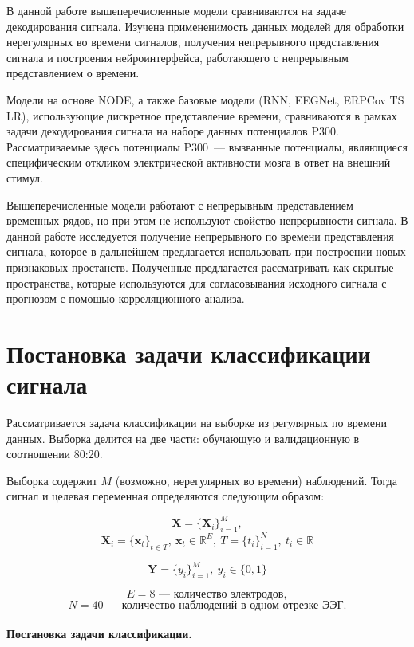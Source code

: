 \documentclass{article}
\newcommand{\x}{\mathbf{x}}
\newcommand{\Y}{\mathbf{Y}}
\newcommand{\X}{\mathbf{X}}
\newcommand{\R}{\mathbb{R}}
\begin{document}
В данной работе вышеперечисленные модели сравниваются на задаче декодирования сигнала. Изучена примененимость данных моделей для обработки нерегулярных во времени сигналов, получения непрерывного представления сигнала и построения нейроинтерфейса, работающего с непрерывным представлением о времени.

Модели на основе NODE, а также базовые модели (RNN, EEGNet\cite{Lawhern2018EEGNetAC}, ERPCov TS LR\cite{6046114}), использующие дискретное представление времени, сравниваются в рамках задачи декодирования сигнала на наборе данных потенциалов P300. Рассматриваемые здесь потенциалы P300~--- вызванные потенциалы, являющиеся специфическим откликом электрической активности мозга в ответ на внешний стимул.

Вышеперечисленные модели работают с непрерывным представлением временных рядов, но при этом не используют свойство непрерывности сигнала. В данной работе исследуется получение непрерывного по времени представления сигнала, которое в дальнейшем предлагается использовать при построении новых признаковых простанств. Полученные предлагается рассматривать как скрытые пространства, которые используются для согласовывания исходного сигнала с прогнозом с помощью корреляционного анализа.

\section{Постановка задачи классификации сигнала}


    
    Рассматривается задача классификации на выборке из регулярных по времени данных. Выборка делится на две части: обучающую и валидационную в соотношении 80:20.
    
    Выборка содержит $M$ (возможно, нерегулярных во времени) наблюдений. Тогда сигнал и целевая переменная определяются следующим образом:
    

    $$\X = \{\X_i\}_{i=1}^{M},$$
    $$\X_i = \{\x_t\}_{t\in T}, \ \x_t \in \R^E, \ T = \{t_i\}_{i=1}^{N},\ t_i \in \R$$ 
    
    $$\Y = \{y_i\}_{i=1}^{M},\ y_i \in \{0, 1\}$$
    
    $$E = 8 \text{~--- количество электродов},$$
    $$N = 40 \text{~--- количество наблюдений в одном отрезке ЭЭГ}.$$

    \paragraph{Постановка задачи классификации.}
    
\end{document}

